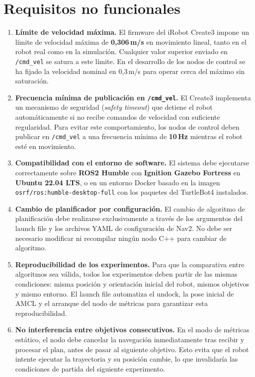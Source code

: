 \newpage
\section{Requisitos no funcionales}

\begin{enumerate}

    \item[\textbf{RNF-01}] \textbf{Límite de velocidad máxima.}
    El firmware del iRobot Create3 impone un límite de velocidad máxima de \textbf{0,306\,m/s} en movimiento lineal, tanto en el robot real como en la simulación. Cualquier valor superior enviado en \texttt{/cmd\_vel} se satura a este límite. En el desarrollo de los nodos de control se ha fijado la velocidad nominal en 0,3\,m/s para operar cerca del máximo sin saturación.

    \item[\textbf{RNF-02}] \textbf{Frecuencia mínima de publicación en \texttt{/cmd\_vel}.}
    El Create3 implementa un mecanismo de seguridad (\textit{safety timeout}) que detiene el robot automáticamente si no recibe comandos de velocidad con suficiente regularidad. Para evitar este comportamiento, los nodos de control deben publicar en \texttt{/cmd\_vel} a una frecuencia mínima de \textbf{10\,Hz} mientras el robot esté en movimiento.

    \item[\textbf{RNF-03}] \textbf{Compatibilidad con el entorno de software.}
    El sistema debe ejecutarse correctamente sobre \textbf{ROS2 Humble} con \textbf{Ignition Gazebo Fortress} en \textbf{Ubuntu 22.04 LTS}, o en un entorno Docker basado en la imagen \texttt{osrf/ros:humble-desktop-full} con los paquetes del TurtleBot4 instalados.

    \item[\textbf{RNF-04}] \textbf{Cambio de planificador por configuración.}
    El cambio de algoritmo de planificación debe realizarse exclusivamente a través de los argumentos del launch file y los archivos YAML de configuración de Nav2. No debe ser necesario modificar ni recompilar ningún nodo C++ para cambiar de algoritmo.

    \item[\textbf{RNF-05}] \textbf{Reproducibilidad de los experimentos.}
    Para que la comparativa entre algoritmos sea válida, todos los experimentos deben partir de las mismas condiciones: misma posición y orientación inicial del robot, mismos objetivos y mismo entorno. El launch file automatiza el undock, la pose inicial de AMCL y el arranque del nodo de métricas para garantizar esta reproducibilidad.

    \item[\textbf{RNF-06}] \textbf{No interferencia entre objetivos consecutivos.}
    En el modo de métricas estático, el nodo debe cancelar la navegación inmediatamente tras recibir y procesar el plan, antes de pasar al siguiente objetivo. Esto evita que el robot intente ejecutar la trayectoria y su posición cambie, lo que invalidaría las condiciones de partida del siguiente experimento.

\end{enumerate}
